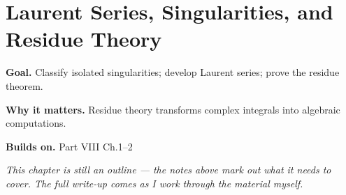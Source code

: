 \chapter{Laurent Series, Singularities, and Residue Theory}
\label{ch:08-complex-analysis-and-harmonic-analysis-03}

\begin{chapterintro}
\textbf{Goal.} Classify isolated singularities; develop Laurent series; prove the residue theorem.

\textbf{Why it matters.} Residue theory transforms complex integrals into algebraic computations.

\textbf{Builds on.} Part VIII Ch.1–2
\end{chapterintro}

\textit{This chapter is still an outline --- the notes above mark out what it needs to cover. The full write-up comes as I work through the material myself.}
